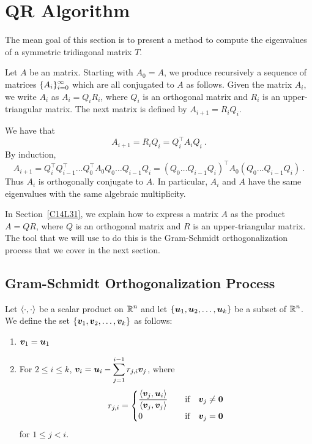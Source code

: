 \section{QR Algorithm}

The mean goal of this section is to present a method to compute the
eigenvalues of a symmetric tridiagonal matrix $T$.

Let $A$ be an \nn matrix.  Starting with $A_0 = A$, we produce
recursively a sequence of \nn matrices
$\displaystyle \{ A_i\}_{i=0}^\infty$ which are all conjugated to $A$
as follows.   Given the \nn matrix $A_i$, we write $A_i$ as
$A_i = Q_i R_i$, where $Q_i$ is an orthogonal matrix and $R_i$ is an
upper-triangular matrix.  The next matrix is defined by
$A_{i+1} = R_i Q_i$.

We have that
\[
A_{i+1} = R_i Q_i = Q_i^\top A_i Q_i \  .
\]
By induction,
\begin{equation} \label{C14L24}
A_{i+1} =  Q_i^\top Q_{i-1}^\top \ldots Q_0^\top A_0 Q_0 \ldots Q_{i-1} Q_i
= \left( Q_0 \ldots Q_{i-1} Q_i\right)^\top A_0 \left( Q_0 \ldots Q_{i-1} Q_i
\right) \  .
\end{equation}
Thus $A_i$ is orthogonally conjugate to $A$.  In particular, $A_i$ and $A$
have the same eigenvalues with the same algebraic multiplicity.

In Section~\ref{C14L31}, we explain how to express a \nn matrix $A$
as the product $A = QR$, where $Q$ is an orthogonal matrix and $R$ is
an upper-triangular matrix.  The tool that we will use to do this
is the Gram-Schmidt orthogonalization process that we cover in the next
section.

\subsection{Gram-Schmidt Orthogonalization Process} \label{C14L25}

\begin{defn}
Let $\left\langle{\cdot} , {\cdot}\right\rangle$ be a scalar product on $\displaystyle \mathbb{R}^n$ and let
$\{\bm{u}_1, \bm{u}_2, \ldots , \bm{u}_k\}$ be a subset of
$\displaystyle \mathbb{R}^n$.
We define the set $\{\bm{v}_1, \bm{v}_2, \ldots , \bm{v}_k\}$ as
follows:
\begin{enumerate}
\item $\bm{v}_1 = \bm{u}_1$
\item For $2 \leq i \leq k$,
$\displaystyle \bm{v}_i = \bm{u}_i - \sum_{j=1}^{i-1}r_{j,i}\bm{v}_j$,
where
\[
r_{j,i} = \begin{cases}
\displaystyle \frac{\left\langle{\bm{v}_j} , {\bm{u}_i}\right\rangle}{\left\langle{\bm{v}_j} , {\bm{v}_j}\right\rangle}
& \quad \text{if} \quad \bm{v}_j \neq \bm{0} \\
0 & \quad \text{if} \quad \bm{v}_j = \bm{0}
\end{cases}
\]
for $1 \leq j < i$.
\end{enumerate}
\label{C14L26}
\end{defn}

